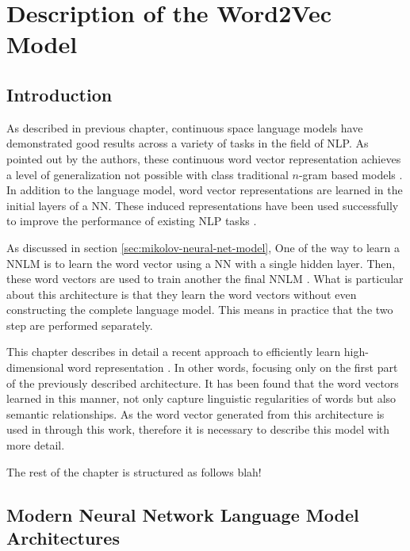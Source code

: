 \chapter{Description of the Word2Vec Model }
\label{chap:word2vec_description}


\section{Introduction}
As described in  previous chapter,  continuous space language  models have
demonstrated good results across a variety of tasks in the field of NLP.  As pointed out by
the authors, these continuous word vector representation achieves a level of
generalization not possible with class traditional $n$-gram based models
\cite{conf/icassp/MikolovKBGC09}. In addition to the language model,  word vector
representations are learned in the initial layers of a \ac{NN}. These
induced representations  have been used successfully to improve the
performance of existing \ac{NLP} tasks \cite{collobert:2008}
\cite{Turian:2010:WRS:1858681.1858721}. 

As discussed in section \ref{sec:mikolov-neural-net-model},  One of the way to learn a
\ac{NNLM} is to learn the word vector using  a \ac{NN} with a single hidden
layer. Then, these word vectors are used to  train another the final
\ac{NNLM} \cite{conf/icassp/MikolovKBGC09}.   
What is particular about this architecture is that they learn the  word
vectors without  even constructing the complete language model.  This means
in practice that the two step are performed separately. 

This chapter describes in detail a recent approach to efficiently learn
high-dimensional word representation \cite{DBLP:journals/corr/abs-1301-3781}.
In other words, focusing only on the first part of the previously described 
architecture. It has been found that the word vectors learned in this manner,
not only capture linguistic regularities of words  but also semantic
relationships. As the word vector generated from this architecture is used in
through this work, therefore it is necessary to describe this model with more
detail.

The rest of the chapter is structured as follows blah!

\section{Modern Neural Network Language Model Architectures}

